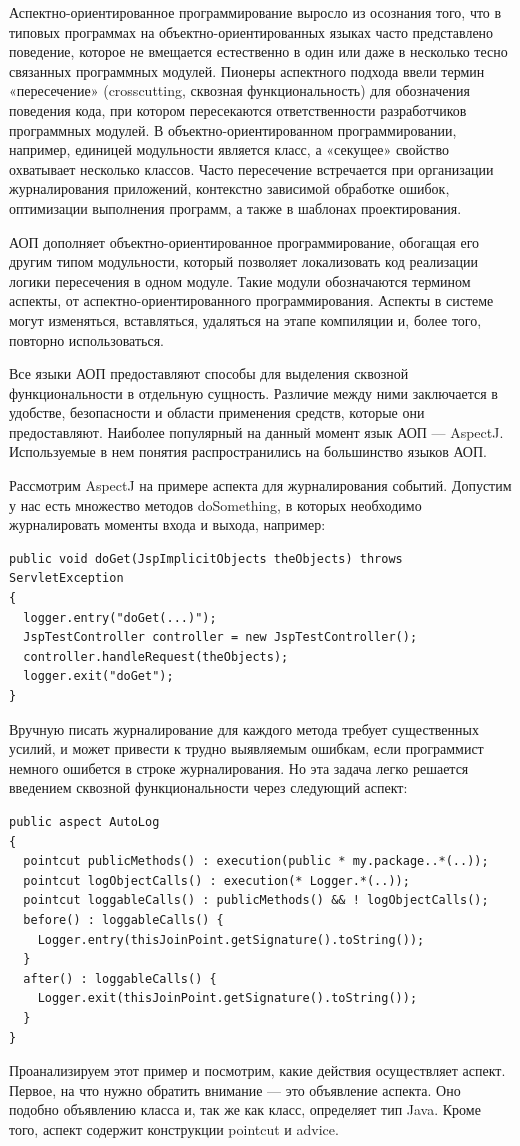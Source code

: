 \documentclass[a4paper,12pt,titlepage]{extarticle}
\begin{document}
Аспектно-ориентированное программирование выросло из осознания того, что в
типовых программах на объектно-ориентированных языках часто представлено
поведение, которое не вмещается естественно в один или даже в несколько тесно
связанных программных модулей. Пионеры аспектного подхода ввели термин
«пересечение» (crosscutting, сквозная функциональность) для обозначения
поведения кода, при котором пересекаются ответственности разработчиков
программных модулей. В объектно-ориентированном программировании, например,
единицей модульности является класс, а «секущее» свойство охватывает несколько
классов. Часто пересечение встречается при организации журналирования
приложений, контекстно зависимой обработке ошибок, оптимизации выполнения
программ, а также в шаблонах проектирования.

АОП дополняет объектно-ориентированное программирование, обогащая его другим
типом модульности, который позволяет локализовать код реализации логики
пересечения в одном модуле. Такие модули обозначаются термином аспекты, от
аспектно-ориентированного программирования. 
Аспекты в системе могут изменяться, вставляться, удаляться на этапе компиляции
и, более того, повторно использоваться.

Все языки АОП предоставляют способы для выделения сквозной функциональности в
отдельную сущность. Различие между ними заключается в удобстве, безопасности и
области применения средств, которые они предоставляют. Наиболее популярный на
данный момент язык АОП — AspectJ. Используемые в нем понятия распространились
на большинство языков АОП.

Рассмотрим AspectJ на примере аспекта для журналирования событий. Допустим у
нас есть множество методов doSomething, в которых необходимо журналировать
моменты входа и выхода, например:
\begin{verbatim}
public void doGet(JspImplicitObjects theObjects) throws ServletException 
{
  logger.entry("doGet(...)");
  JspTestController controller = new JspTestController();
  controller.handleRequest(theObjects);
  logger.exit("doGet");
}
\end{verbatim}
Вручную писать журналирование для каждого метода требует существенных усилий, и
может привести к трудно выявляемым ошибкам, если программист немного ошибется
в строке журналирования. Но эта задача легко решается введением сквозной
функциональности через следующий аспект:
\begin{verbatim}
public aspect AutoLog 
{
  pointcut publicMethods() : execution(public * my.package..*(..));
  pointcut logObjectCalls() : execution(* Logger.*(..));
  pointcut loggableCalls() : publicMethods() && ! logObjectCalls();
  before() : loggableCalls() {
    Logger.entry(thisJoinPoint.getSignature().toString());
  }
  after() : loggableCalls() {
    Logger.exit(thisJoinPoint.getSignature().toString());
  }
}
\end{verbatim}
Проанализируем этот пример и посмотрим, какие действия осуществляет аспект.
Первое, на что нужно обратить внимание — это объявление аспекта. Оно подобно
объявлению класса и, так же как класс, определяет тип Java. Кроме того, аспект
содержит конструкции pointcut и advice.
\end{document}
